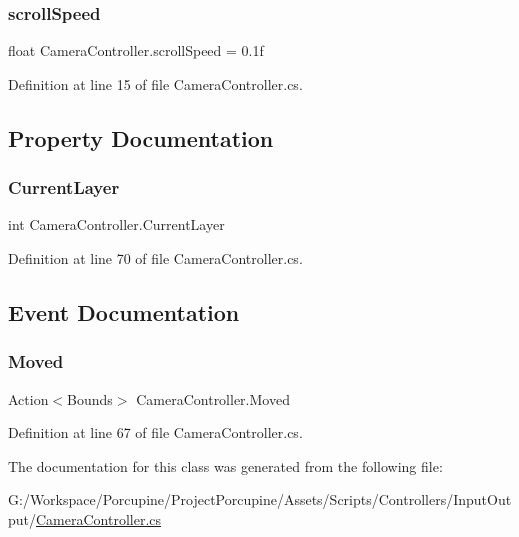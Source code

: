 \subsubsection{\texorpdfstring{scroll\+Speed}{scrollSpeed}}
{\footnotesize\ttfamily float Camera\+Controller.\+scroll\+Speed = 0.\+1f}



Definition at line 15 of file Camera\+Controller.\+cs.



\subsection{Property Documentation}
\mbox{\label{class_camera_controller_a2ca9b5b3b41679613229d313a22243d2}} 
\subsubsection{\texorpdfstring{Current\+Layer}{CurrentLayer}}
{\footnotesize\ttfamily int Camera\+Controller.\+Current\+Layer\hspace{0.3cm}{\ttfamily [get]}}



Definition at line 70 of file Camera\+Controller.\+cs.



\subsection{Event Documentation}
\mbox{\label{class_camera_controller_a660773a1d2a570dec85afc8f105bd523}} 
\subsubsection{\texorpdfstring{Moved}{Moved}}
{\footnotesize\ttfamily Action$<$Bounds$>$ Camera\+Controller.\+Moved}



Definition at line 67 of file Camera\+Controller.\+cs.



The documentation for this class was generated from the following file\+:\begin{DoxyCompactItemize}
\item 
G\+:/\+Workspace/\+Porcupine/\+Project\+Porcupine/\+Assets/\+Scripts/\+Controllers/\+Input\+Output/\hyperlink{_camera_controller_8cs}{Camera\+Controller.\+cs}\end{DoxyCompactItemize}
